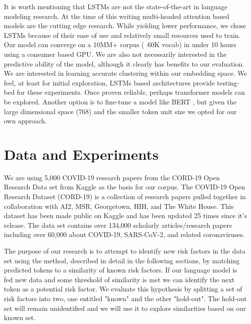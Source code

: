 \documentclass[11pt,a4paper]{article}
\begin{document}
It is worth mentioning that LSTMs are not the state-of-the-art in language modeling research. At the time of this writing multi-headed attention based models \cite{vaswani2017attention} are the cutting edge research. While yielding lower performance, we chose LSTMs because of their ease of use and relatively small resources used to train. Our model can converge on a 10MM+ corpus (~60K vocab) in under 10 hours using a consumer based GPU. We are also not necessarily interested in the predictive ability of the model, although it clearly has benefits to our evaluation. We are interested in learning accurate clustering within our embedding space. We feel, at least for initial exploration, LSTMs based architectures provide testing-bed for these experiments. Once proven reliable, perhaps transformer models can be explored. Another option is to fine-tune a model like BERT \cite{devlin2018bert}, but given the large dimensional space (768) and the smaller token unit size we opted for our own approach.


\section{Data and Experiments}
We are using 5,000 COVID-19 research papers from the CORD-19 Open Research Data \cite{wang2020cord} set from Kaggle as the basis for our corpus. The COVID-19 Open Research Dataset (CORD-19) is a collection of research papers pulled together in collaboration with AI2, MSR, Georgetown, HIH, and The White House. This dataset has been made public on Kaggle and has been updated 25 times since it’s release. The data set contains over 134,000 scholarly articles/research papers including over 60,000 about COVID-19, SARS-CoV-2, and related coronaviruses.

The purpose of our research is to attempt to identify new risk factors in the data set using the method, described in detail in the following sections, by matching predicted tokens to a similarity of known risk factors. If our language model is fed new data and some threshold of similarity is met we can identify the next token as a potential risk factor. We evaluate this hypothesis by splitting a set of risk factors into two, one entitled "known" and the other "hold-out". The hold-out set will remain unidentified and we will use it to explore similarities based on our known set.
\end{document}
